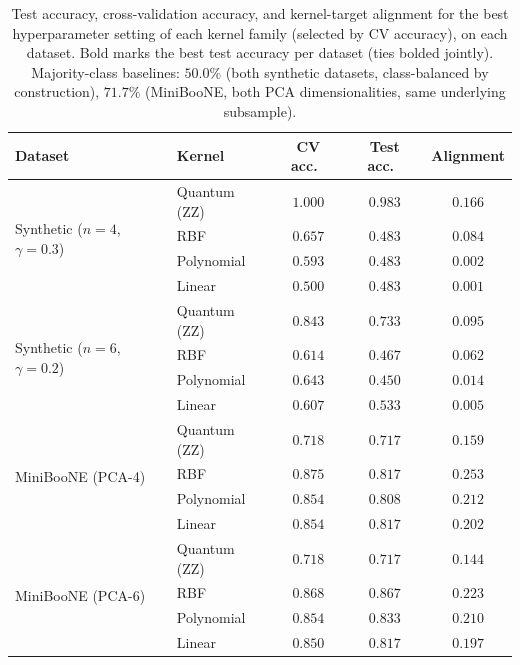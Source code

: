 \documentclass{article}
\begin{document}
\begin{table}[t]
  \caption{Test accuracy, cross-validation accuracy, and kernel-target
  alignment for the best hyperparameter setting of each kernel family
  (selected by CV accuracy), on each dataset. Bold marks the best test
  accuracy per dataset (ties bolded jointly). Majority-class baselines:
  $50.0\%$ (both synthetic datasets, class-balanced by construction),
  $71.7\%$ (MiniBooNE, both PCA dimensionalities, same underlying
  subsample).}
  \label{tab:main}
  \centering
  \small
  \begin{tabular}{llccc}
    \toprule
    Dataset & Kernel & CV acc.\ & Test acc.\ & Alignment \\
    \midrule
    \multirow{4}{*}{Synthetic ($n{=}4$, $\gamma{=}0.3$)}
      & Quantum (ZZ) & $1.000$ & $\mathbf{0.983}$ & $0.166$ \\
      & RBF          & $0.657$ & $0.483$ & $0.084$ \\
      & Polynomial   & $0.593$ & $0.483$ & $0.002$ \\
      & Linear       & $0.500$ & $0.483$ & $0.001$ \\
    \midrule
    \multirow{4}{*}{Synthetic ($n{=}6$, $\gamma{=}0.2$)}
      & Quantum (ZZ) & $0.843$ & $\mathbf{0.733}$ & $0.095$ \\
      & RBF          & $0.614$ & $0.467$ & $0.062$ \\
      & Polynomial   & $0.643$ & $0.450$ & $0.014$ \\
      & Linear       & $0.607$ & $0.533$ & $0.005$ \\
    \midrule
    \multirow{4}{*}{MiniBooNE (PCA-4)}
      & Quantum (ZZ) & $0.718$ & $0.717$ & $0.159$ \\
      & RBF          & $0.875$ & $\mathbf{0.817}$ & $0.253$ \\
      & Polynomial   & $0.854$ & $0.808$ & $0.212$ \\
      & Linear       & $0.854$ & $\mathbf{0.817}$ & $0.202$ \\
    \midrule
    \multirow{4}{*}{MiniBooNE (PCA-6)}
      & Quantum (ZZ) & $0.718$ & $0.717$ & $0.144$ \\
      & RBF          & $0.868$ & $\mathbf{0.867}$ & $0.223$ \\
      & Polynomial   & $0.854$ & $0.833$ & $0.210$ \\
      & Linear       & $0.850$ & $0.817$ & $0.197$ \\
    \bottomrule
  \end{tabular}
\end{table}
\end{document}
